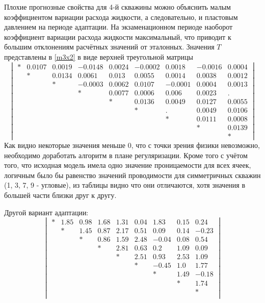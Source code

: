 \documentclass[14pt]{article}
\begin{document}
Плохие прогнозные свойства для 4-й скважины можно объяснить малым коэффициентом вариации расхода жидкости, а следовательно, и пластовым давлением на периоде адаптации. На экзаменационном периоде наоборот коэффициент вариации расхода жидкости максимальный, что приводит к большим отклонениям расчётных значений от эталонных.
	Значения $T$ представлены в \ref{m3x2} в виде верхней треугольной матрицы
\begin{equation*} \label{m3x2}
\begin{vmatrix}
 * &  0.0107 &  0.0019 & -0.0148  & 0.0024 & -0.0002 &   0.0018 &  -0.0016  & 0.0004 \\
  & *  & 0.0134  & 0.0061 &  0.013   & 0.0055  & 0.0014  & 0.0038 &  0.0012 \\
 &   & * & -0.0003  & 0.0062 &  0.0107  & -0.0001  & 0.0004  & 0.0013 \\
  &  &   & * &  0.0077  & 0.0006 &  0.006  &  0.0023 &  . \\
  &     &  &  & * &  0.0136  & 0.0049  & 0.0127  & 0.0055 \\
  &   &   &   &  & *  & . &  0.0049  & 0.0106 \\
   &  &   &   &   &  &  *  & 0.0111  & 0.0008 \\
  &   &  &  &   &  &  & * &  0.0139 \\
   &  &    &  &   &  &  &  & *
\end{vmatrix}
\end{equation*}
Как видно некоторые значения меньше 0, что с точки зрения физики невозможно, необходимо доработать алгоритм в плане регуляризации. Кроме того с учётом того, что исходная модель имела одно значение проницаемости для всех ячеек, логичным  было бы равенство значений проводимости для симметричных скважин (1, 3, 7, 9 - угловые), из таблицы видно что они отличаются, хотя значения в большей части близки друг к другу. 

Другой вариант адаптации:
\begin{equation*} \label{m3x3}
	\begin{vmatrix}
* &1.85 &0.98 &1.68 &1.31 &0.04 &1.83 &0.15 &0.24\\
&* &1.45 &0.87 &2.17 &0.51 &0.09 &0.14 &-0.23\\
& &* &0.86 &1.59 &2.48 &-0.04 &0.08 &0.54\\
& & &* &2.81 &0.63 &0.2 &1.09 &0.09\\
& & & &* &2.51 &0.93 &2.53 &1.09\\
& & & & &* &-0.45 &1.0 &1.77\\
& & & & & &* &1.49 &-0.18\\
& & & & & & &* &1.74\\
& & & & & & & &*\\
\end{vmatrix}
\end{equation*}
\end{document}
